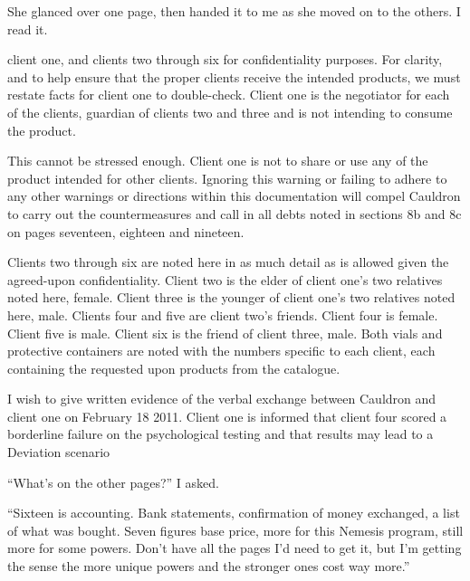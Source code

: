 She glanced over one page, then handed it to me as she moved on to the others.  I read it.



client one, and clients two through six for confidentiality purposes.  For clarity, and to help ensure that the proper clients receive the intended products, we must restate facts for client one to double-check.  Client one is the negotiator for each of the clients, guardian of clients two and three and is not intending to consume the product.



This cannot be stressed enough.  Client one is not to share or use any of the product intended for other clients.  Ignoring this warning or failing to adhere to any other warnings or directions within this documentation will compel Cauldron to carry out the countermeasures and call in all debts noted in sections 8b and 8c on pages seventeen, eighteen and nineteen.



Clients two through six are noted here in as much detail as is allowed given the agreed-upon confidentiality.
\blacksquare  Client two is the elder of client one's two relatives noted here, female.
\blacksquare  Client three is the younger of client one's two relatives noted here, male.
\blacksquare  Clients four and five are client two's friends.  Client four is female.  Client five is male.
\blacksquare  Client six is the friend of client three, male.
Both vials and protective containers are noted with the numbers specific to each client, each containing the requested upon products from the catalogue.



I wish to give written evidence of the verbal exchange between Cauldron and client one on February 18 2011.  Client one is informed that client four scored a borderline failure on the psychological testing and that results may lead to a Deviation scenario



``What's on the other pages?'' I asked.



``Sixteen is accounting.  Bank statements, confirmation of money exchanged, a list of what was bought.  Seven figures base price, more for this Nemesis program, still more for some powers.  Don't have all the pages I'd need to get it, but I'm getting the sense the more unique powers and the stronger ones cost way more.''



